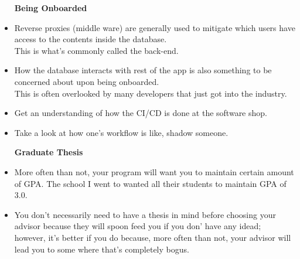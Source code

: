 \documentclass{article}
\begin{document}
	\begin{itemize}
	\item [\textbf{Being Onboarded}]
	\item Reverse proxies (middle ware) are generally used to mitigate which users have access to the contents inside the database. \\
		This is what's commonly called the back-end.
	\item How the database interacts with rest of the app is also something to be concerned about upon being onboarded. \\
		This is often overlooked by many developers that just got into the industry.
	\item Get an understanding of how the CI/CD is done at the software shop.
	\item Take a look at how one's workflow is like, shadow someone.
	\end{itemize}
	\begin{itemize}
	\item [\textbf{Graduate Thesis}]
	\item More often than not, your program will want you to maintain certain amount of GPA. The school I went to wanted all their students to maintain GPA of 3.0.
	\item You don't necessarily need to have a thesis in mind before choosing your advisor because they will spoon feed you if you don' have any idead; \\
		however, it's better if you do because, more often than not, your advisor will lead you to some where that's completely bogus.
	\end{itemize}
\end{document}
